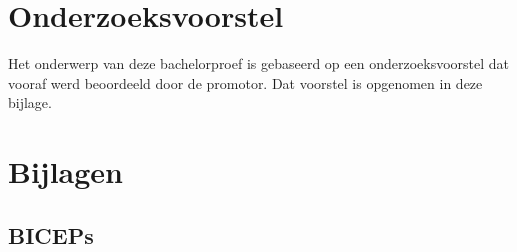 \documentclass[dutch,dit,thesis]{hogentreport}
\begin{document}





%
%




\appendix

\chapter{Onderzoeksvoorstel}

Het onderwerp van deze bachelorproef is gebaseerd op een onderzoeksvoorstel dat vooraf werd beoordeeld door de promotor. Dat voorstel is opgenomen in deze bijlage.






%
\chapter{Bijlagen}

\section{BICEPs}
\label{sec:BICEPs}
\end{document}
